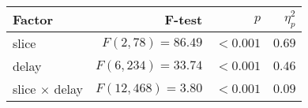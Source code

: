 \setlength{\tabcolsep}{0pt} %
\begin{tabular*}{\columnwidth}{@{\extracolsep{\fill}\quad}lrrr@{}}
\textbf{Factor} & \textbf{F-test} & \textbf{\(p\)} & \textbf{\(\eta^{2}_{p}\)} \\ \toprule
slice & \(F(2, 78) = 86.49 \) & \(<0.001\) & \(0.69\) \\
delay & \(F(6, 234) = 33.74\) & \(<0.001\) & \(0.46\) \\
slice \(\times\) delay & \(F(12, 468) = 3.80\) & \(<0.001\) & \(0.09\) \\ \bottomrule
\end{tabular*}%